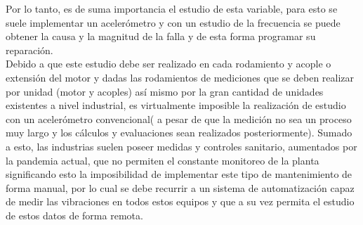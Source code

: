 	Por lo tanto, es de suma importancia el estudio de esta variable, para esto se suele implementar un acelerómetro y con un estudio de la frecuencia se puede obtener la causa y la magnitud de la falla y de esta forma programar su reparación.\\
	Debido a que este estudio debe ser realizado en cada rodamiento y acople o extensión del motor y dadas las rodamientos de mediciones que se deben realizar por unidad (motor y acoples) así mismo por la gran cantidad de unidades existentes a nivel industrial, es virtualmente imposible la realización de estudio con un acelerómetro convencional( a pesar de que la medición no sea un proceso muy largo y los cálculos y evaluaciones sean realizados posteriormente). Sumado a esto, las industrias suelen poseer medidas y controles sanitario, aumentados por la pandemia actual, que no permiten el constante monitoreo de la planta significando esto la imposibilidad de implementar este tipo de mantenimiento de forma manual, por lo cual se debe recurrir a un sistema de automatización capaz de medir las vibraciones en todos estos equipos y que a su vez permita el estudio de estos datos de forma remota. 

	
